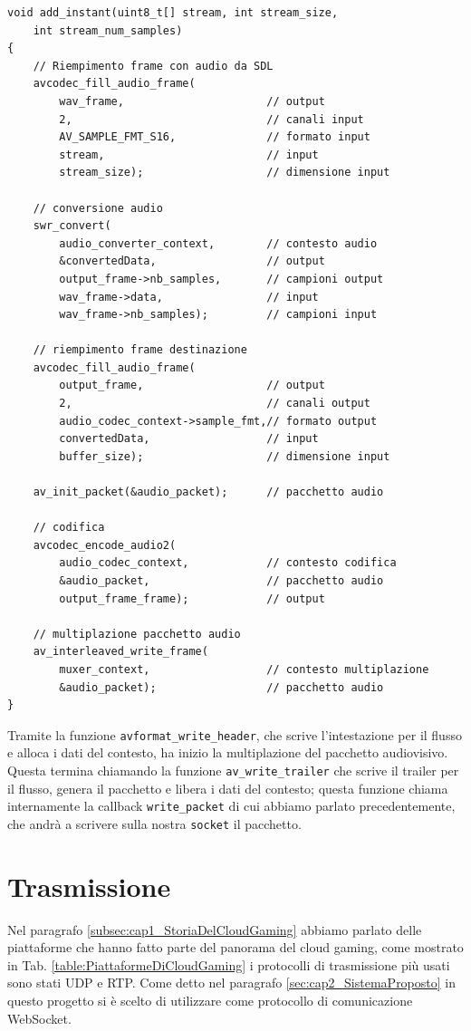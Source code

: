 \begin{lstlisting}[caption=Codice per la codifica audio, label={lst:audioCodecFFmpeg}]
void add_instant(uint8_t[] stream, int stream_size, 
	int stream_num_samples)
{
	// Riempimento frame con audio da SDL
	avcodec_fill_audio_frame(
		wav_frame,						// output
		2,								// canali input
		AV_SAMPLE_FMT_S16,				// formato input
		stream,							// input
		stream_size);					// dimensione input			

	// conversione audio
	swr_convert(
		audio_converter_context,		// contesto audio
		&convertedData,					// output
		output_frame->nb_samples,		// campioni output
		wav_frame->data,				// input
		wav_frame->nb_samples);			// campioni input

	// riempimento frame destinazione
	avcodec_fill_audio_frame(
		output_frame, 					// output
		2,								// canali output
		audio_codec_context->sample_fmt,// formato output
		convertedData,					// input
		buffer_size);					// dimensione input			
			
	av_init_packet(&audio_packet);		// pacchetto audio
	
	// codifica
	avcodec_encode_audio2(
		audio_codec_context,			// contesto codifica
		&audio_packet,					// pacchetto audio
		output_frame_frame);			// output			
	
	// multiplazione pacchetto audio
	av_interleaved_write_frame(
		muxer_context,					// contesto multiplazione
		&audio_packet);					// pacchetto audio
}
\end{lstlisting}

Tramite la funzione \verb|avformat_write_header|, che scrive l'intestazione per il flusso e alloca i dati del contesto, ha inizio la multiplazione del pacchetto audiovisivo. Questa termina chiamando la funzione \verb|av_write_trailer| che scrive il trailer per il flusso, genera il pacchetto e libera i dati del contesto; questa funzione chiama internamente la callback \verb|write_packet| di cui abbiamo parlato precedentemente, che andrà a scrivere sulla nostra \verb|socket| il pacchetto.


\section{Trasmissione}
Nel paragrafo \ref{subsec:cap1_StoriaDelCloudGaming} abbiamo parlato delle piattaforme che hanno fatto parte del panorama del cloud gaming, come mostrato in Tab. \ref{table:PiattaformeDiCloudGaming} i protocolli di trasmissione più usati sono stati UDP e RTP. Come detto nel paragrafo \ref{sec:cap2_SistemaProposto} in questo progetto si è scelto di utilizzare come protocollo di comunicazione WebSocket.


